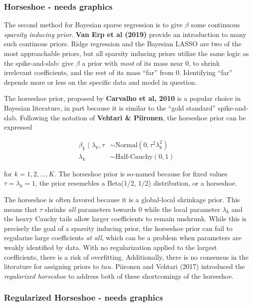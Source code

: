 \documentclass[]{article}
\begin{document}
\subsubsection{Horseshoe - needs
graphics}\label{horseshoe---needs-graphics}

The second method for Bayesian sparse regression is to give \(\beta\)
some continuous \emph{sparsity inducing prior}. \textbf{Van Erp et al
(2019)} provide an introduction to many such continous priors. Ridge
regression and the Bayesian LASSO are two of the most approachable
priors, but all sparsity inducing priors utilize the same logic as the
spike-and-slab: give \(\beta\) a prior with \emph{most} of its mass near
0, to shrink irrelevant coefficients, and the rest of its mass ``far''
from 0. Identifying ``far'' depends more or less on the specific data
and model in question.

The horseshoe prior, proposed by \textbf{Carvalho et al, 2010} is a
popular choice in Bayesian literature, in part because it is similar to
the ``gold standard'' spike-and-slab. Following the notation of
\textbf{Vehtari \& Piironen}, the horseshoe prior can be expressed

\[
\begin{aligned}
\beta_k \text{ | } \lambda_k, \tau & \sim \text{Normal}(0, \tau^2\lambda_k^2) \\
\lambda_k & \sim \text{Half-Cauchy}(0, 1)
\end{aligned}
\]

for \(k = 1, 2, ..., K\). The horseshoe prior is so-named because for
fixed values \(\tau = \lambda_k = 1\), the prior resemebles a Beta(1/2,
1/2) distribution, or a horseshoe.

The horseshoe is often favored because it is a global-local shrinkage
prior. This means that \(\tau\) shrinks \emph{all} parameters towards 0
while the local parameter \(\lambda_k\) and the heavy Cauchy tails allow
larger coefficients to remain unshrunk. While this is precisely the goal
of a sparsity inducing prior, the horseshoe prior can fail to regularize
large coefficients \emph{at all}, which can be a problem when parameters
are weakly identified by data. With no regularization applied to the
largest coefficients, there is a risk of overfitting. Additionally,
there is no consensus in the literature for assigning priors to \(tau\).
Piironen and Vehtari (2017) introduced the \emph{regularized horseshoe}
to address both of these shortcomings of the horseshoe.

\subsubsection{Regularized Horseshoe - needs
graphics}\label{regularized-horseshoe---needs-graphics}
\end{document}

